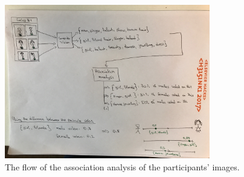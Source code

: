 \begin{figure}[h] 
    \begin{center}
        \includegraphics[width=0.8\textwidth]{Images/association_analysis_flow.jpg}
        \caption{The flow of the association analysis of the participants' images.}
        \label{association_analysis_flow}
    \end{center}
\end{figure}
